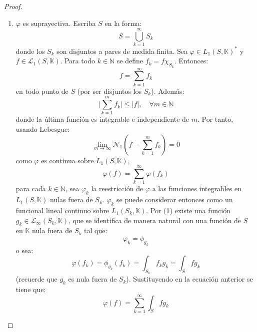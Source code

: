 \documentclass[12pt]{report}
\theoremstyle{largebreak}
\newcommand\abs[1]{\ensuremath{\big|#1\big|}}
\newcommand{\N}[2]{\ensuremath{\mathcal{N}_{#1}\left(#2\right)}}
\begin{document}
\begin{proof}
\begin{enumerate}
            \item $\varphi$ es suprayectiva. Escriba $S$ en la forma:
            \begin{equation*}
                S=\bigcup_{ k=1}^\infty S_k
            \end{equation*}
            donde los $S_k$ son disjuntos a pares de medida finita. Sea $\varphi\in L_1(S,\mathbb{K})^*$ y $f\in\mathcal{L}_1(S,\mathbb{K})$. Para todo $k\in\mathbb{N}$ se define $f_k=f\chi_{S_k}$. Entonces:
            \begin{equation*}
                f=\sum_{ k=1}^{\infty}f_k
            \end{equation*}
            en todo punto de $S$ (por ser disjuntos los $S_k$). Además:
            \begin{equation*}
                \abs{\sum_{ k=1}^{m}f_k}\leq \abs{f},\quad\forall m\in\mathbb{N}
            \end{equation*}
            donde la última función es integrable e independiente de $m$.
            Por tanto, usando Lebesgue:
            \begin{equation*}
                \lim_{ m\rightarrow\infty}\N{1}{f-\sum_{ k=1}^{m}f_k}=0
            \end{equation*}
            como $\varphi$ es continua sobre $L_1(S,\mathbb{K})$,
            \begin{equation}
                \varphi(f)=\sum_{ k=1}^{\infty}\varphi(f_k)
            \end{equation}
            para cada $k\in\mathbb{N}$, sea $\varphi_k$ la reestricción de $\varphi$ a las funciones integrables en $L_1(S,\mathbb{K})$ nulas fuera de $S_k$. $\varphi_k$ se puede considerar entonces como un funcional lineal continuo sobre $L_1(S_k,\mathbb{K})$. Por (1) existe una función $g_k\in\mathcal{L}_\infty(S_k,\mathbb{K})$, que se identifica de manera natural con una función de $S$ en $\mathbb{K}$ nula fuera de $S_k$ tal que:
            \begin{equation*}
                \varphi_k=\phi_{g_k}
            \end{equation*}
            o sea:
            \begin{equation*}
                \varphi(f_k)=\phi_{ g_k}(f_k)=\int_{S_k}f_kg_k=\int_Sfg_k
            \end{equation*}
            (recuerde que $g_k$ es nula fuera de $S_k$). Sustituyendo en la ecuación anterior se tiene que:
            \begin{equation*}
                \varphi(f)=\sum_{ k=1}^{\infty}\int_Sfg_k

\end{equation*}
\end{enumerate}
\end{proof}
\end{document}
